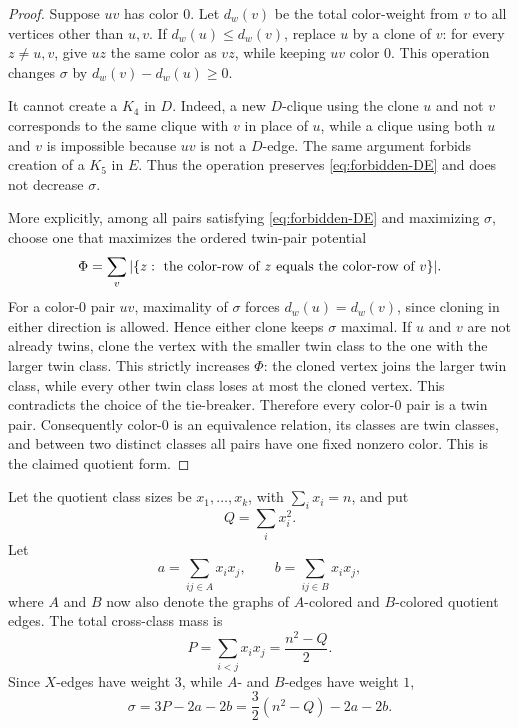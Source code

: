 \documentclass[12pt]{article}
\theoremstyle{plain}
\theoremstyle{definition}
\theoremstyle{remark}
\begin{document}
\begin{proof}
Suppose \(uv\) has color \(0\).  Let \(d_w(v)\) be the total color-weight from
\(v\) to all vertices other than \(u,v\).  If \(d_w(u)\le d_w(v)\), replace
\(u\) by a clone of \(v\): for every \(z\ne u,v\), give \(uz\) the same color
as \(vz\), while keeping \(uv\) color \(0\).  This operation changes \(\sigma\)
by \(d_w(v)-d_w(u)\ge0\).

It cannot create a \(K_4\) in \(D\).  Indeed, a new \(D\)-clique using the
clone \(u\) and not \(v\) corresponds to the same clique with \(v\) in place of
\(u\), while a clique using both \(u\) and \(v\) is impossible because \(uv\) is
not a \(D\)-edge.  The same argument forbids creation of a \(K_5\) in \(E\).
Thus the operation preserves \eqref{eq:forbidden-DE} and does not decrease
\(\sigma\).

More explicitly, among all pairs satisfying \eqref{eq:forbidden-DE} and
maximizing \(\sigma\), choose one that maximizes the ordered twin-pair
potential
\[
  \Phi=\sum_v |\{z:\hbox{ the color-row of }z\hbox{ equals the color-row of }v\}|.
\]
For a color-\(0\) pair \(uv\), maximality of \(\sigma\) forces
\(d_w(u)=d_w(v)\), since cloning in either direction is allowed.  Hence either
clone keeps \(\sigma\) maximal.  If \(u\) and \(v\) are not already twins, clone
the vertex with the smaller twin class to the one with the larger twin class.
This strictly increases \(\Phi\): the cloned vertex joins the larger twin
class, while every other twin class loses at most the cloned vertex.  This
contradicts the choice of the tie-breaker.  Therefore every color-\(0\) pair is
a twin pair.  Consequently color-\(0\) is an equivalence relation, its classes
are twin classes, and between two distinct classes all pairs have one fixed
nonzero color.  This is the claimed quotient form.
\end{proof}

Let the quotient class sizes be \(x_1,\ldots,x_k\), with
\(\sum_i x_i=n\), and put
\[
  Q=\sum_i x_i^2.
\]
Let
\[
  a=\sum_{ij\in A}x_i x_j,
  \qquad
  b=\sum_{ij\in B}x_i x_j,
\]
where \(A\) and \(B\) now also denote the graphs of \(A\)-colored and
\(B\)-colored quotient edges.  The total cross-class mass is
\[
  P=\sum_{i<j}x_i x_j=\frac{n^2-Q}{2}.
\]
Since \(X\)-edges have weight \(3\), while \(A\)- and \(B\)-edges have weight
\(1\),
\begin{equation}\label{eq:sigma-quotient}
  \sigma=3P-2a-2b=\frac32(n^2-Q)-2a-2b.
\end{equation}
\end{document}
